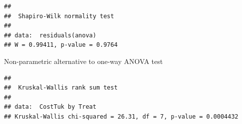\documentclass[
  11pt,
]{article}
\begin{document}
\begin{verbatim}
## 
##  Shapiro-Wilk normality test
## 
## data:  residuals(anova)
## W = 0.99411, p-value = 0.9764
\end{verbatim}

Non-parametric alternative to one-way ANOVA test

\begin{verbatim}
## 
##  Kruskal-Wallis rank sum test
## 
## data:  CostTuk by Treat
## Kruskal-Wallis chi-squared = 26.31, df = 7, p-value = 0.0004432
\end{verbatim}
\end{document}
